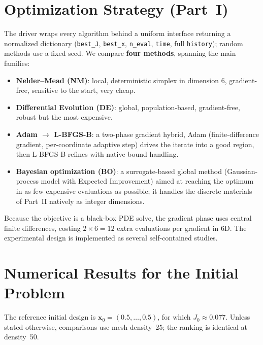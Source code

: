 \documentclass[11pt,a4paper]{article}
\begin{document}
\section{Optimization Strategy (Part~I)}
The driver wraps every algorithm behind a uniform interface returning a normalized dictionary
(\texttt{best\_J}, \texttt{best\_x}, \texttt{n\_eval}, \texttt{time}, full \texttt{history}); random
methods use a fixed seed. We compare \textbf{four methods}, spanning the main families:
\begin{itemize}
  \item \textbf{Nelder--Mead (NM)}: local, deterministic simplex in dimension 6, gradient-free,
  sensitive to the start, very cheap.
  \item \textbf{Differential Evolution (DE)}: global, population-based, gradient-free, robust but
  the most expensive.
  \item \textbf{Adam $\rightarrow$ L-BFGS-B}: a two-phase gradient hybrid, Adam (finite-difference
  gradient, per-coordinate adaptive step) drives the iterate into a good region, then L-BFGS-B
  refines with native bound handling.
  \item \textbf{Bayesian optimization (BO)}: a surrogate-based global method (Gaussian-process model
  with Expected Improvement) aimed at reaching the optimum in as few expensive evaluations as possible;
  it handles the discrete materials of Part~II natively as integer dimensions.
\end{itemize}
Because the objective is a black-box PDE solve, the gradient phase uses central finite differences,
costing $2\times6=12$ extra evaluations per gradient in 6D. The experimental design is implemented as several self-contained studies.

\section{Numerical Results for the Initial Problem}
The reference initial design is $\mathbf{x}_0=(0.5,\dots,0.5)$, for which $J_0\approx0.077$.
Unless stated otherwise, comparisons use mesh density~25; the ranking is identical at density~50.
\end{document}
